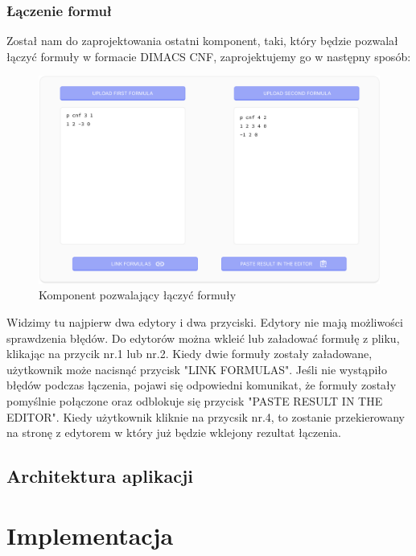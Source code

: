\documentclass[a4paper,12pt,oneside]{book}
\theoremstyle{definition}
\begin{document}
\subsection{Łączenie formuł}

Został nam do zaprojektowania ostatni komponent, taki, który będzie pozwalał łączyć formuły w formacie DIMACS CNF, zaprojektujemy go w następny sposób: 

\begin{figure}[ht]
    \centering
    \includegraphics[width=14.30cm]{11}
    \caption{Komponent pozwalający łączyć formuły}
    \label{fig:11}
\end{figure}

\noindent Widzimy tu najpierw dwa edytory i dwa przyciski. Edytory nie mają możliwości sprawdzenia błędów. Do edytorów można wkleić lub załadować formułę z pliku, klikając na przycik nr.1 lub nr.2. Kiedy dwie formuły zostały załadowane, użytkownik może nacisnąć przycisk "LINK FORMULAS". Jeśli nie wystąpiło błędów podczas łączenia, pojawi się odpowiedni komunikat, że formuły zostały pomyślnie połączone oraz odblokuje się przycisk "PASTE RESULT IN THE EDITOR". Kiedy użytkownik kliknie na przycsik nr.4, to zostanie przekierowany na stronę z edytorem w który już będzie wklejony rezultat łączenia.

\section{Architektura aplikacji}

\lipsum[1]

\lipsum[2]

\lipsum[3]

\chapter{Implementacja}
\end{document}
